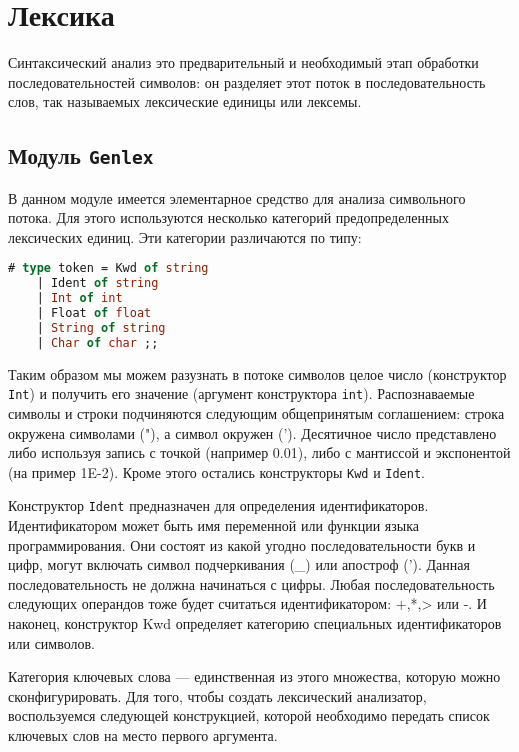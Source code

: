 \section{Лексика}

Синтаксический анализ это предварительный и необходимый этап обработки
последовательностей символов: он разделяет этот поток в последовательность слов,
так называемых лексические единицы или лексемы.

\subsection{Модуль \texttt{Genlex}}

В данном модуле имеется элементарное средство для анализа символьного потока.
Для этого используются несколько категорий предопределенных лексических единиц.
Эти категории различаются по типу:

\begin{lstlisting}[language=Caml]
# type token = Kwd of string
    | Ident of string
    | Int of int
    | Float of float
    | String of string
    | Char of char ;;
\end{lstlisting}

Таким образом мы можем разузнать в потоке символов целое число (конструктор
\texttt{Int}) и получить его значение (аргумент конструктора \texttt{int}).
Распознаваемые символы и строки подчиняются следующим общепринятым соглашением:
строка окружена символами ("), а символ окружен ('). Десятичное число
представлено либо используя запись с точкой (например 0.01), либо с мантиссой и
экспонентой (на пример 1E-2). Кроме этого остались конструкторы \texttt{Kwd} и
\texttt{Ident}.

Конструктор \texttt{Ident} предназначен для определения идентификаторов.
Идентификатором может быть имя переменной или функции языка программирования.
Они состоят из какой угодно последовательности букв и цифр, могут включать
символ подчеркивания (\_) или апостроф ('). Данная последовательность не должна
начинаться с цифры. Любая последовательность следующих операндов тоже будет
считаться идентификатором: +,*,> или -. И наконец, конструктор Kwd определяет
категорию специальных идентификаторов или символов.

Категория ключевых слова --- единственная из этого множества, которую можно
сконфигурировать. Для того, чтобы создать лексический анализатор, воспользуемся
следующей конструкцией, которой необходимо передать список ключевых слов на
место первого аргумента.

